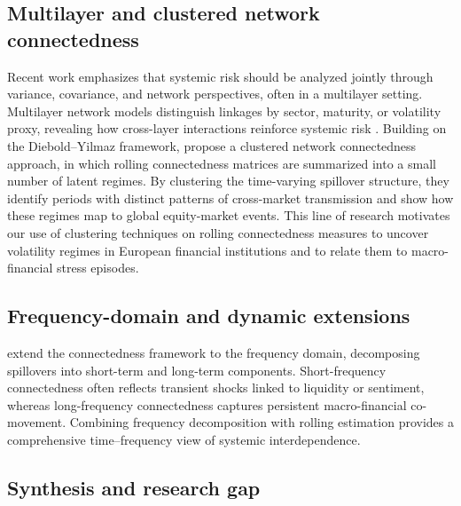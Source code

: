 \subsection{Multilayer and clustered network connectedness}

Recent work emphasizes that systemic risk should be analyzed jointly through variance,
covariance, and network perspectives, often in a multilayer setting. Multilayer network
models distinguish linkages by sector, maturity, or volatility proxy, revealing how
cross-layer interactions reinforce systemic risk \citep{WangEtAl2021}. Building on the
Diebold--Yilmaz framework, \citet{BuchwalterDieboldYilmaz2025} propose a clustered
network connectedness approach, in which rolling connectedness matrices are summarized
into a small number of latent regimes. By clustering the time-varying spillover structure,
they identify periods with distinct patterns of cross-market transmission and show how
these regimes map to global equity-market events. This line of research motivates our use
of clustering techniques on rolling connectedness measures to uncover volatility regimes
in European financial institutions and to relate them to macro-financial stress episodes.

\subsection{Frequency-domain and dynamic extensions}

\citet{BarunikKrehlik2018} extend the connectedness framework to the frequency domain,
decomposing spillovers into short-term and long-term components. Short-frequency
connectedness often reflects transient shocks linked to liquidity or sentiment, whereas
long-frequency connectedness captures persistent macro-financial co-movement. Combining
frequency decomposition with rolling estimation provides a comprehensive time--frequency
view of systemic interdependence.

\subsection{Synthesis and research gap}

